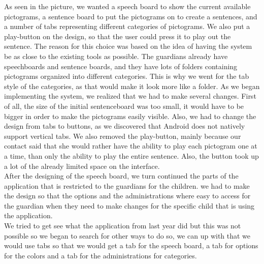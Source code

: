 As seen in the picture, we wanted a speech board to show the current available pictograms, a sentence board to put the pictograms on to create a sentences, and a number of tabs representing different categories of pictograms. We also put a play-button on the design, so that the user could press it to play out the sentence.\newline
The reason for this choice was based on the idea of having the system be as close to the existing tools as possible. The guardians already have speechboards and sentence boards, and they have lots of folders containing pictograms organized into different categories. This is why we went for the tab style of the categories, as that would make it look more like a folder.\newline
As we began implementing the system, we realized that we had to make several changes. First of all, the size of the initial sentenceboard was too small, it would have to be bigger in order to make the pictograms easily visible. Also, we had to change the design from tabs to buttons, as we discovered that Android does not natively support vertical tabs. We also removed the play-button, mainly because our contact said that she would rather have the ability to play each pictogram one at a time, than only the ability to play the entire sentence. Also, the button took up a lot of the already limited space on the interface.\newline
\\
After the designing of the speech board, we turn continued the parts of the application that is restricted to the guardians for the children. we had to make the design so that the options and the administrations where easy to access for the guardian when they need to make changes for the specific child that is using the application. 
\\
We tried to get see what the application from last year did but this was not possible so we began to search for other ways to do so, we can up with that we would use tabs so that we would get a tab for the speech board, a tab for options for the colors and a tab for the administrations for categories.\\

